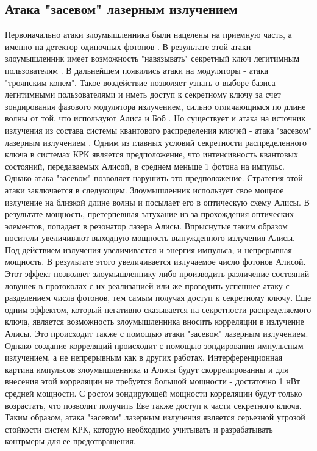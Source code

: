 \subsection{Атака "засевом" лазерным излучением}\label{sec:ch1/sect7/subsec1}
Первоначально атаки злоумышленника были нацелены на приемную часть, а именно на детектор одиночных фотонов \cite{makarov2009, sajeed2020, chistiakov2019, qian2018}. В результате этой атаки злоумышленник имеет возможность "навязывать" секретный ключ легитимным пользователям \cite{lydersen2010}. 
В дальнейшем  появились атаки на модуляторы - атака "троянским конем". Такое воздействие позволяет узнать о выборе базиса легитимными пользователями и иметь доступ к секретному ключу за счет зондирования фазового модулятора излучением, сильно отличающимся по длине волны от той, что используют Алиса и Боб \cite{jain2014,a-etsi2021,gisin2006}.
Но существует и атака на источник излучения из состава системы квантового распределения ключей - атака "засевом" лазерным излучением \cite{huang2019,lovic2023}. Одним из главных условий секретности распределенного ключа в системах КРК является предположение, что интенсивность квантовых состояний, передаваемых Алисой, в среднем меньше 1 фотона на импульс.
Однако атака "засевом" позволяет нарушить это предположение. Стратегия этой атаки заключается в следующем. Злоумышленник использует свое мощное излучение на близкой длине волны и посылает его в оптическую схему Алисы.
В результате мощность, претерпевшая затухание из-за прохождения оптических элементов, попадает в резонатор лазера Алисы. Впрыснутые таким образом носители увеличивают выходную мощность вынужденного излучения Алисы. 
Под действием излучения увеличивается и энергия импульса, и непрерывная мощность. В результате этого увеличивается излучаемое число фотонов Алисой. Этот эффект позволяет злоумышленнику либо производить различение состояний-ловушек в протоколах с их реализацией или же проводить успешнее атаку с разделением числа фотонов, тем самым получая доступ к секретному ключу. 
Еще одним эффектом, который негативно сказывается на секретности распределяемого ключа, является возможность злоумышленника вносить корреляции в излучение Алисы. Это происходит также с помощью атаки "засевом" лазерным излучением.
Однако создание корреляций происходит с помощью зондирования импульсным излучением, а не непрерывным как в других работах. Интерференционная картина импульсов злоумышленника и Алисы будут скоррелированны и для внесения этой корреляции не требуется большой мощности - достаточно 1 нВт средней мощности. 
С ростом зондирующей мощности корреляции будут только возрастать, что позволит получить Еве также доступ к части секретного ключа.
\newline Таким образом, атака "засевом" лазерным излучения является серьезной угрозой стойкости систем КРК, которую необходимо учитывать и разрабатывать контрмеры для ее предотвращения. 

